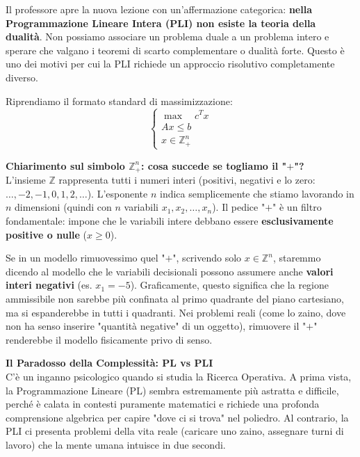 \documentclass[12pt, a4paper]{article}
\begin{document}
	\vspace{0.1cm}
	Il professore apre la nuova lezione con un'affermazione categorica: \textbf{nella Programmazione Lineare Intera (PLI) non esiste la teoria della dualità}. Non possiamo associare un problema duale a un problema intero e sperare che valgano i teoremi di scarto complementare o dualità forte. Questo è uno dei motivi per cui la PLI richiede un approccio risolutivo completamente diverso.
	
	Riprendiamo il formato standard di massimizzazione:
	\[
	\begin{cases}
		\max \quad c^T x \\
		Ax \leq b \\
		x \in \mathbb{Z}^n_+
	\end{cases}
	\]
	
	\textbf{Chiarimento sul simbolo $\mathbb{Z}^n_+$: cosa succede se togliamo il "$+$"?}\\
	L'insieme $\mathbb{Z}$ rappresenta tutti i numeri interi (positivi, negativi e lo zero: $\dots, -2, -1, 0, 1, 2, \dots$). 
	L'esponente $n$ indica semplicemente che stiamo lavorando in $n$ dimensioni (quindi con $n$ variabili $x_1, x_2, \dots, x_n$).
	Il pedice "$+$" è un filtro fondamentale: impone che le variabili intere debbano essere \textbf{esclusivamente positive o nulle} ($x \geq 0$). 
	
	Se in un modello rimuovessimo quel "$+$", scrivendo solo $x \in \mathbb{Z}^n$, staremmo dicendo al modello che le variabili decisionali possono assumere anche \textbf{valori interi negativi} (es. $x_1 = -5$). Graficamente, questo significa che la regione ammissibile non sarebbe più confinata al primo quadrante del piano cartesiano, ma si espanderebbe in tutti i quadranti. Nei problemi reali (come lo zaino, dove non ha senso inserire "quantità negative" di un oggetto), rimuovere il "$+$" renderebbe il modello fisicamente privo di senso.
	
	\vspace{0.4cm}
	\textbf{Il Paradosso della Complessità: PL vs PLI}\\
	C'è un inganno psicologico quando si studia la Ricerca Operativa. A prima vista, la Programmazione Lineare (PL) sembra estremamente più astratta e difficile, perché è calata in contesti puramente matematici e richiede una profonda comprensione algebrica per capire "dove ci si trova" nel poliedro. Al contrario, la PLI ci presenta problemi della vita reale (caricare uno zaino, assegnare turni di lavoro) che la mente umana intuisce in due secondi.
	
\end{document}
